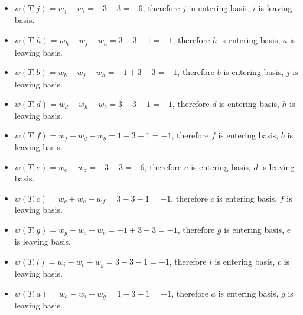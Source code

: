                     \begin{itemize}
                        \item $w(T, j) = w_j - w_i = -3 -3 = -6$, therefore $j$ in entering basis, $i$ is leaving basis.
                        \item $w(T, h) = w_h + w_j - w_a = 3-3-1=-1$, therefore $h$ is entering basis, $a$ is leaving basis.
                        \item $w(T, b) = w_b - w_j - w_h = -1 + 3 - 3 = -1$, therefore $b$ is entering basis, $j$ is leaving basis.
                        \item $w(T, d) = w_d - w_h + w_b = 3 - 3 - 1 = -1$, therefore $d$ is entering basis, $h$ is leaving basis.
                        \item $w(T, f) = w_f - w_d - w_b = 1 - 3 + 1 = -1$, therefore $f$ is entering basis, $b$ is leaving basis.
                        \item $w(T, e) = w_e - w_d = -3 -3 = -6$, therefore $e$ is entering basis, $d$ is leaving basis.
                        \item $w(T,c) = w_c + w_e - w_f = 3 -3 - 1 = -1$, therefore $c$ is entering basis, $f$ is leaving basis.
                        \item $w(T,g) = w_g - w_e - w_c = -1 + 3 - 3 = -1$, therefore $g$ is entering basis, $e$ is leaving basis.
                        \item $w(T,i) = w_i - w_c + w_g =3 - 3 - 1= -1 $, therefore $i$ is entering basis, $c$ is leaving basis.
                        \item $w(T,a) = w_a - w_i - w_g = 1 - 3 + 1 = -1$, therefore $a$ is entering basis, $g$ is leaving basis.                
                    \end{itemize}

